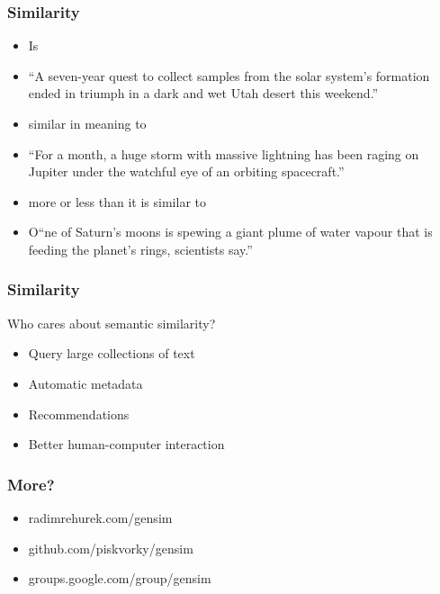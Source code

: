 \begin{frame}[fragile]\frametitle{Similarity}
\begin{itemize}
\item Is
\item ``A seven-year quest to collect samples from the
solar system's formation ended in triumph in a
dark and wet Utah desert this weekend.''
\item similar in meaning to
\item ``For a month, a huge storm with massive
lightning has been raging on Jupiter under the
watchful eye of an orbiting spacecraft.''
\item more or less than it is similar to
\item O``ne of Saturn's moons is spewing a giant plume
of water vapour that is feeding the planet's
rings, scientists say.''

\end{itemize}
\end{frame}

\begin{frame}[fragile]\frametitle{Similarity}

Who cares about semantic similarity? 

\begin{itemize}
\item Query large collections of text
\item Automatic metadata
\item Recommendations
\item Better human-computer interaction
\end{itemize}
\end{frame}

\begin{frame}[fragile]\frametitle{More?}

\begin{itemize}
\item radimrehurek.com/gensim
\item github.com/piskvorky/gensim
\item groups.google.com/group/gensim
\end{itemize}
\end{frame}
